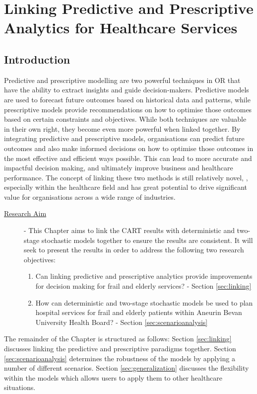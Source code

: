\documentclass[../thesis.tex]{subfiles}
\begin{document}
\chapter{Linking Predictive and Prescriptive Analytics for Healthcare Services}\label{chp:Linking}

\section{Introduction}
Predictive and prescriptive modelling are two powerful techniques in OR that have the ability to extract insights and guide decision-makers. Predictive models are used to forecast future outcomes based on historical data and patterns, while prescriptive models provide recommendations on how to optimise those outcomes based on certain constraints and objectives. While both techniques are valuable in their own right, they become even more powerful when linked together. By integrating predictive and prescriptive models, organisations can predict future outcomes and also make informed decisions on how to optimise those outcomes in the most effective and efficient ways possible. This can lead to more accurate and impactful decision making, and ultimately improve business and healthcare performance. The concept of linking these two methods is still relatively novel, \cite{Lopes2020,Williams2022}, especially within the healthcare field and has great potential to drive significant value for organisations across a wide range of industries.

\begin{description}
\item[\underline{Research Aim}] - This Chapter aims to link the CART results with deterministic and two-stage stochastic models together to ensure the results are consistent. It will seek to present the results in order to address the following two research objectives:
\begin{enumerate}
    \item Can linking predictive and prescriptive analytics provide improvements for decision making for frail and elderly services? - Section \ref{sec:linking}
    \item How can deterministic and two-stage stochastic models be used to plan hospital services for frail and elderly patients within Aneurin Bevan University Health Board? - Section \ref{sec:scenarioanalysis}
\end{enumerate}
\end{description}
The remainder of the Chapter is structured as follows: Section \ref{sec:linking} discusses linking the predictive and prescriptive paradigms together. Section \ref{sec:scenarioanalysis} determines the robustness of the models by applying a number of different scenarios. Section \ref{sec:generalization} discusses the flexibility within the models which allows users to apply them to other healthcare situations.
\end{document}
